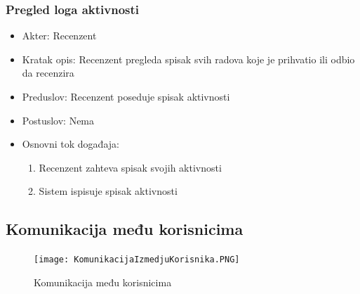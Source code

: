 \documentclass[a4paper]{article}
\begin{document}
\subsubsection{Pregled loga aktivnosti}
\label{subsubsection:pregledloga}
\begin{itemize}
    \item Akter: Recenzent
    \item Kratak opis: Recenzent pregleda spisak svih radova koje je prihvatio ili odbio da recenzira
    \item Preduslov: Recenzent poseduje spisak aktivnosti
    \item Postuslov: Nema
    \item Osnovni tok događaja:
        \begin{enumerate}
            \item Recenzent zahteva spisak svojih aktivnosti
            \item Sistem ispisuje spisak aktivnosti
        \end{enumerate}
\end{itemize}

\newpage

\subsection{Komunikacija među korisnicima}
\label{subsection:komunikacijasec}
\begin{figure}[hbt!]
    \centering
    \texttt{[image: KomunikacijaIzmedjuKorisnika.PNG]}
    \caption{Komunikacija među korisnicima \cite{alex} \cite{vparadigm}}
    \label{fig:komunikacija}
\end{figure}
\end{document}
